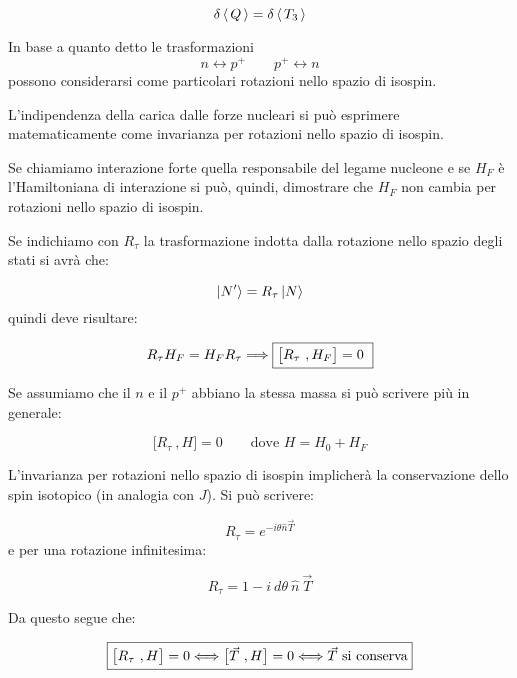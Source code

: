 \begin{equation*}
  \delta \left\langle\, Q \,\right\rangle = \delta \left\langle\, T_3 \,\right\rangle
\end{equation*}

In base a quanto detto le trasformazioni
\begin{equation*}
n  \longleftrightarrow p^+ \qquad p^+  \longleftrightarrow n
\end{equation*}
possono considerarsi come particolari rotazioni nello spazio di isospin. 

L'indipendenza della carica dalle forze nucleari si può esprimere
matematicamente come invarianza per rotazioni nello spazio di isospin.

Se chiamiamo interazione forte quella responsabile del legame nucleone e se
$H_F$ è l'Hamiltoniana di interazione si può, quindi, dimostrare che $H_F$ non
cambia per rotazioni nello spazio di isospin. 

Se indichiamo con $R_\tau$ la trasformazione indotta dalla rotazione nello
spazio degli stati si avrà che:

\begin{equation*}
\Ket{N'} = R_\tau \Ket{N}
\end{equation*}
quindi deve risultare:

\begin{equation*}
R_\tau H_F = H_F R_\tau \Longrightarrow \fbox{$\bigl[R_\tau \ , H_F \bigr] = 0$ }
\end{equation*}

Se assumiamo che il $n$ e il $p^+$ abbiano la stessa massa si può scrivere più
in generale:

\begin{equation*}
  \bigl[R_\tau \ , H \bigr] = 0 \qquad \text{dove } H = H_0 + H_F
\end{equation*}

L'invarianza per rotazioni nello spazio di isospin implicherà la conservazione dello spin isotopico (in analogia con $J$). Si può scrivere: 

\begin{equation*}
R_\tau = e^{-i \theta \hat{n} \vec{T}}
\end{equation*}
e per una rotazione infinitesima:

\begin{equation*}
R_\tau= 1 - i \ d\theta \ \hat{n} \ \vec{T}
\end{equation*}

Da questo segue che:

\begin{equation*}
\fbox{$\bigl[R_\tau \ , H \bigr] = 0 \Longleftrightarrow \bigl[\vec{T} \ , H \bigr] = 0 \Longleftrightarrow \vec{T}$ si  conserva}
\end{equation*}

